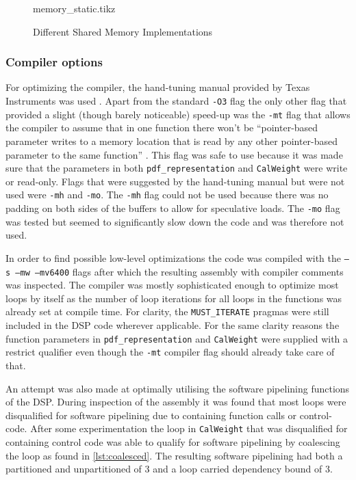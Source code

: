 \documentclass[final]{article}
\begin{document}
\begin{figure}[H]
    {memory_static.tikz}
    \caption{Different Shared Memory Implementations}
    \label{fig:memory}
\end{figure}


\subsubsection{Compiler options}
For optimizing the compiler, the hand-tuning manual provided by Texas Instruments was used \cite{handtuning}.
Apart from the standard \texttt{-O3} flag the only other flag that provided a slight (though barely noticeable) speed-up was the \texttt{-mt} flag that allows the compiler to assume that in one function there won't be ``pointer-based parameter writes to a memory location that is read by any other pointer-based parameter to the same function'' \cite{handtuning}.
This flag was safe to use because it was made sure that the parameters in both \texttt{pdf\_representation} and \texttt{CalWeight} were write or read-only.
Flags that were suggested by the hand-tuning manual but were not used were \texttt{-mh} and \texttt{-mo}.
The \texttt{-mh} flag could not be used because there was no padding on both sides of the buffers to allow for speculative loads.
The \texttt{-mo} flag was tested but seemed to significantly slow down the code and was therefore not used.

In order to find possible low-level optimizations the code was compiled with the \texttt{–s –mw –mv6400} flags after which the resulting assembly with compiler comments was inspected. The compiler was mostly sophisticated enough to optimize most loops by itself as the number of loop iterations for all loops in the functions was already set at compile time. For clarity, the \texttt{MUST\_ITERATE} pragmas were still included in the DSP code wherever applicable. For the same clarity reasons the function parameters in \texttt{pdf\_representation} and \texttt{CalWeight} were supplied with a restrict qualifier even though the \texttt{-mt} compiler flag should already take care of that.

An attempt was also made at optimally utilising the software pipelining functions of the DSP.
During inspection of the assembly it was found that most loops were disqualified for software pipelining due to containing function calls or control-code.
After some experimentation the loop in \texttt{CalWeight} that was disqualified for containing control code was able to qualify for software pipelining by coalescing the loop as found in \cref{lst:coalesced}.
The resulting software pipelining had both a partitioned and unpartitioned of 3 and a loop carried dependency bound of 3.
\end{document}
